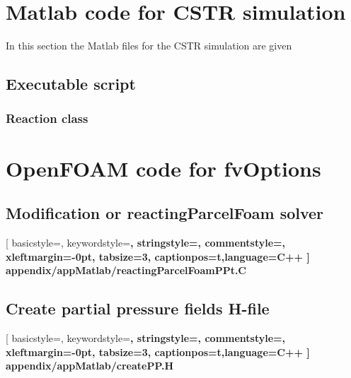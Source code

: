 \section{Matlab code for CSTR simulation}
\label{app:ch:Matlab:sec:CSTR}
In this section the Matlab files for the CSTR simulation are given
\subsection{Executable script}
\label{app:ch:Matlab:sec:CSTR:subsec:Exe}

\subsubsection{Reaction class}
\label{app:ch:Matlab:sec:CSTR:subsec:Classes:subsubsec:R}


\clearpage
\section{OpenFOAM code for fvOptions}
\label{app:ch:Matlab:sec:OF}
\subsection{Modification or reactingParcelFoam solver}

[	%
	basicstyle=\scriptsize\ttfamily,
	keywordstyle=\bfseries\ttfamily\color{orange},
	stringstyle=\color{darkgreen}\ttfamily,
	commentstyle=\color{gray}\ttfamily,
	xleftmargin=-0pt,
	tabsize=3,
	captionpos=t,language=C++
]
{appendix/appMatlab/reactingParcelFoamPPt.C}
\subsection{Create partial pressure fields H-file}
\label{app:ch:Matlab:sec:OF:subsec:createP}

[	%
	basicstyle=\scriptsize\ttfamily,
	keywordstyle=\bfseries\ttfamily\color{orange},
	stringstyle=\color{darkgreen}\ttfamily,
	commentstyle=\color{gray}\ttfamily,
	xleftmargin=-0pt,
	tabsize=3,
	captionpos=t,language=C++
]
{appendix/appMatlab/createPP.H}
